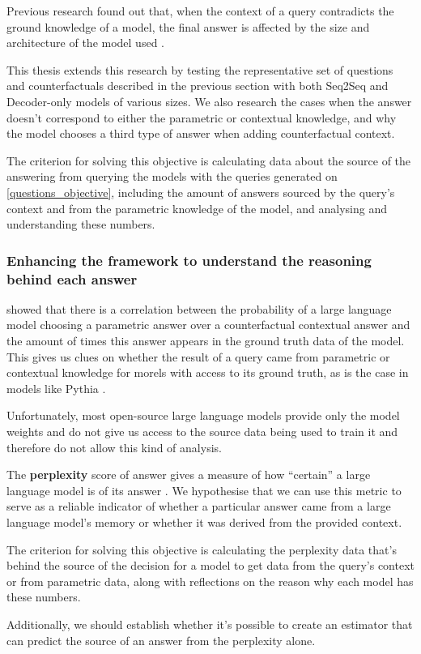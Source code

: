 Previous research found out that, when the context of a query contradicts the ground knowledge of a model, the final answer is affected by the size and architecture of the model used \citep{factual_recall}.

This thesis extends this research by testing the representative set of questions and counterfactuals described in the previous section with both Seq2Seq and Decoder-only models of various sizes.
We also research the cases when the answer doesn't correspond to either the parametric or contextual knowledge, and why the model chooses a third type of answer when adding counterfactual context.

The criterion for solving this objective is calculating data about the source of the answering from querying the models with the queries generated on \cref{questions_objective}, including the amount of answers sourced by the query's context and from the parametric knowledge of the model, and analysing and understanding these numbers.


\subsubsection{Enhancing the framework to understand the reasoning behind each answer}

 showed that there is a correlation between the probability of a large language model choosing a parametric answer over a counterfactual contextual answer and the amount of times this answer appears in the ground truth data of the model.
This gives us clues on whether the result of a query came from parametric or contextual knowledge for morels with access to its ground truth, as is the case in models like Pythia \citep{pythia}.

Unfortunately, most open-source large language models provide only the model weights and do not give us access to the source data being used to train it and therefore do not allow this kind of analysis.

The \textbf{perplexity} score of answer gives a measure of how ``certain'' a large language model is of its answer \citep{how_can_we_know}.
We hypothesise that we can use this metric to serve as a reliable indicator of whether a particular answer came from a large language model's memory or whether it was derived from the provided context.

The criterion for solving this objective is calculating the perplexity data that's behind the source of the decision for a model to get data from the query's context or from parametric data, along with reflections on the reason why each model has these numbers.

Additionally, we should establish whether it's possible to create an estimator that can predict the source of an answer from the perplexity alone.
